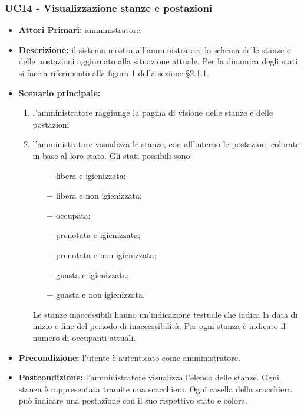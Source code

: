\subsubsection{ UC14 - Visualizzazione stanze e postazioni}
\begin{itemize}
	\item\textbf{Attori Primari:}
	amministratore.
	\item\textbf{Descrizione:}
	il sistema mostra all'amministratore lo schema delle stanze e delle postazioni aggiornato alla situazione attuale. Per la dinamica degli stati si faccia riferimento alla figura 1 della sezione §2.1.1.
	\item\textbf{Scenario principale:}
	\begin{enumerate}
		\item l'amministratore raggiunge la pagina di visione delle stanze e delle postazioni
		\item l'amministratore visualizza le stanze, con all'interno le postazioni colorate in base al loro stato. Gli stati possibili sono:
		\begin{itemize}
			\item[$-$] libera e igienizzata;
			\item[$-$] libera e non igienizzata;
			\item[$-$] occupata;
			\item[$-$] prenotata e igienizzata;
			\item[$-$] prenotata e non igienizzata;
			\item[$-$] guasta e igienizzata;
			\item[$-$] guasta e non igienizzata.
		\end{itemize}
		Le stanze inaccessibili hanno un'indicazione testuale che indica la data di inizio e fine del periodo di inaccessibilità. \newline
		Per ogni stanza è indicato il numero di occupanti attuali.
	\end{enumerate}
	
	\item\textbf{Precondizione:} 
	l'utente è autenticato come amministratore.
	\item\textbf{Postcondizione:}
	l'amministratore visualizza l'elenco delle stanze. Ogni stanza è rappresentata tramite una scacchiera. Ogni casella della scacchiera può indicare una postazione con il suo rispettivo stato e colore.
\end{itemize}


